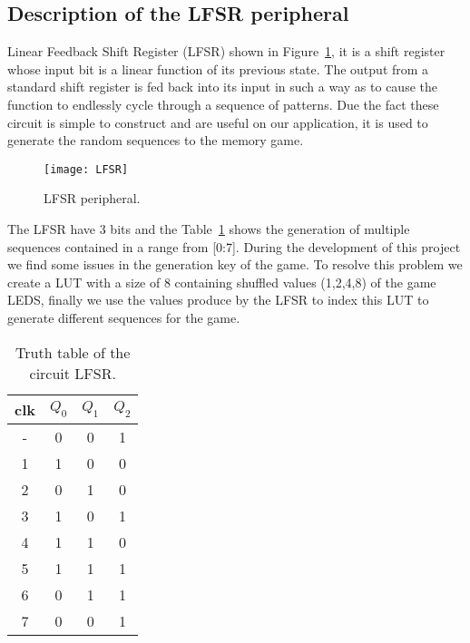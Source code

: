 \clearpage
\subsection{Description of the LFSR peripheral}
Linear Feedback Shift Register (LFSR) shown in Figure~\ref{fig:LFSR}, it is a shift register 
whose input bit is a linear function of its previous state. The output from a standard shift register is fed back into its input in such a 
way as to cause the function to endlessly cycle through a sequence of patterns. Due the fact these circuit is simple to construct
and are useful on our application, it is used to generate the random sequences to the memory game.

\vspace{10pt}
\begin{figure}[!htbp]
    \centerline{\texttt{[image: LFSR]}}
    \vspace{0cm}\caption{LFSR peripheral.}
    \label{fig:LFSR}
\end{figure}

\noindent The LFSR have 3 bits and the Table~\ref{tab:LFSR} shows the generation of multiple sequences contained in 
a range from [0:7]. During the development of this project we find some issues in the generation key of the game.
To resolve this problem we create a LUT with a size of 8 containing shuffled values (1,2,4,8) of the game LEDS,
finally we use the values produce by the LFSR to index this LUT to generate different sequences for the game.

\begin{table}[!htbp]
\centering
    \begin{tabular}{c|ccc}
        clk & $Q_0$ & $Q_1$ & $Q_2$ \\
        \hline
        - & 0 & 0 & 1 \\
        1 & 1 & 0 & 0 \\
        2 & 0 & 1 & 0 \\
        3 & 1 & 0 & 1 \\
        4 & 1 & 1 & 0 \\
        5 & 1 & 1 & 1 \\
        6 & 0 & 1 & 1 \\
        7 & 0 & 0 & 1 \\   
    \end{tabular}
    \caption{Truth table of the circuit LFSR.}
    \label{tab:LFSR}
\end{table} 

\clearpage
